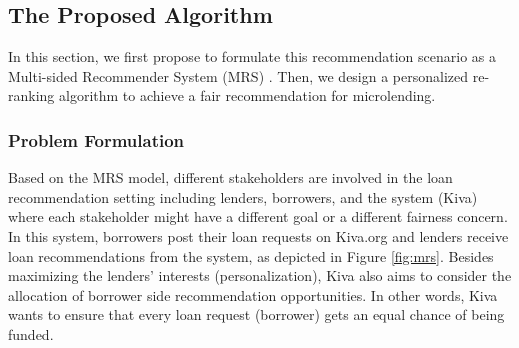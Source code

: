 \subsection{The Proposed Algorithm}
\label{subsec:far_algorithm}
In this section, we first propose to formulate this recommendation scenario as a Multi-sided Recommender System (MRS) \cite{burke2017multisided, burke2017patterns}. Then, we design a personalized re-ranking algorithm to achieve a fair recommendation for microlending.


\subsubsection{Problem Formulation}

Based on the MRS model, different stakeholders are involved in the loan recommendation setting including lenders, borrowers, and the system (Kiva) where each stakeholder might have a different goal or a different fairness concern. In this system, borrowers post their loan requests on Kiva.org and lenders receive loan recommendations from the system, as depicted in Figure \ref{fig:mrs}. 
Besides maximizing the lenders' interests (personalization), Kiva also aims to consider the allocation of borrower side recommendation opportunities. In other words, Kiva wants to ensure that every loan request (borrower) gets an equal chance of being funded.



